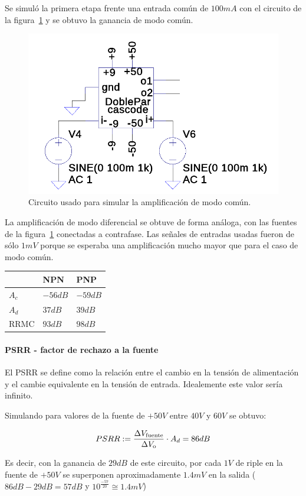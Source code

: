 \documentclass[a4paper,12pt,twoside]{article}
\begin{document}
Se simuló la primera etapa frente una entrada común de $100mA$ con el circuito de la figura~\ref{fig:ac} y se obtuvo la ganancia de modo común.


\begin{figure}[H]
	\centering
	\includegraphics[height=0.2\textwidth]{img/sim/ac}
	\caption{Circuito usado para simular la amplificación de modo común.}
	\label{fig:ac}
\end{figure}


La amplificación de modo diferencial se obtuve de forma análoga, con las fuentes de la figura~\ref{fig:ac} conectadas a contrafase. Las señales de entradas usadas fueron de sólo $1mV$ porque se esperaba una amplificación mucho mayor que para el caso de modo común. 

\begin{table}[H]
\centering
\begin{tabular}{l|ll}
 & NPN & PNP \\ \hline
$A_c$ & $-56dB$ & $-59dB$  \\
$A_d$ & $37dB$ & $39dB$  \\
RRMC & $93dB$ & $98dB$  
\end{tabular}
\end{table}

\paragraph{PSRR - factor de rechazo a la fuente}

El PSRR se define como la relación entre el cambio en la tensión de alimentación y el cambie equivalente en la tensión de entrada. Idealemente este valor sería infinito.

Simulando para valores de la fuente de $+50V$ entre $40V$ y $60V$ se obtuvo:

\[ PSRR := {\Delta V_\mathrm{fuente} \over {\Delta V_\mathrm{o}}} \cdot A_d = 86dB \]



Es decir, con la ganancia de $29dB$ de este circuito, por cada $1V$ de riple en la fuente de $+50V$ se superponen aproximadamente $1.4mV$ en la salida ($86dB-29dB=57dB$ y $10^\frac{-57}{20} \cong 1.4mV $)
\end{document}
